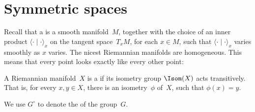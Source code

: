 \section{Symmetric spaces}

Recall that a  is
a smooth manifold~$M$, together with the choice of an inner
product $\langle \cdot \mid \cdot \rangle_x$ on the tangent
space~$T_x M$, for each $x \in M$, such that $\langle \cdot
\mid \cdot \rangle_x$ varies smoothly as $x$ varies.
The nicest Riemannian manifolds are homogeneous. This means that every
point looks exactly like every other point:

\begin{defn} \label{HomogDefn}
 A Riemannian manifold~$X$ is a  if its
isometry group $\Isom(X)$ acts transitively. That is, for every $x,y
\in X$, there is an isometry~$\phi$ of~$X$, such that $\phi(x) = y$.
 \end{defn}

\begin{notation} \label{GoNotation}
We use $G^\circ$ to denote the  of the group~$G$.
\end{notation}

